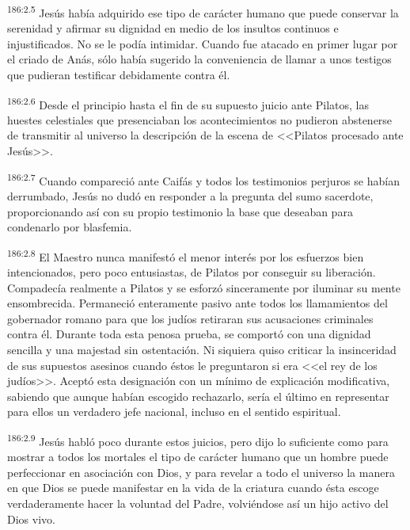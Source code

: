 \par 
\textsuperscript{186:2.5} Jesús había adquirido ese tipo de carácter humano que puede conservar la serenidad y afirmar su dignidad en medio de los insultos continuos e injustificados. No se le podía intimidar. Cuando fue atacado en primer lugar por el criado de Anás, sólo había sugerido la conveniencia de llamar a unos testigos que pudieran testificar debidamente contra él.

\par 
\textsuperscript{186:2.6} Desde el principio hasta el fin de su supuesto juicio ante Pilatos, las huestes celestiales que presenciaban los acontecimientos no pudieron abstenerse de transmitir al universo la descripción de la escena de <<Pilatos procesado ante Jesús>>.

\par 
\textsuperscript{186:2.7} Cuando compareció ante Caifás y todos los testimonios perjuros se habían derrumbado, Jesús no dudó en responder a la pregunta del sumo sacerdote, proporcionando así con su propio testimonio la base que deseaban para condenarlo por blasfemia.

\par 
\textsuperscript{186:2.8} El Maestro nunca manifestó el menor interés por los esfuerzos bien intencionados, pero poco entusiastas, de Pilatos por conseguir su liberación. Compadecía realmente a Pilatos y se esforzó sinceramente por iluminar su mente ensombrecida. Permaneció enteramente pasivo ante todos los llamamientos del gobernador romano para que los judíos retiraran sus acusaciones criminales contra él. Durante toda esta penosa prueba, se comportó con una dignidad sencilla y una majestad sin ostentación. Ni siquiera quiso criticar la insinceridad de sus supuestos asesinos cuando éstos le preguntaron si era <<el rey de los judíos>>. Aceptó esta designación con un mínimo de explicación modificativa, sabiendo que aunque habían escogido rechazarlo, sería el último en representar para ellos un verdadero jefe nacional, incluso en el sentido espiritual.

\par 
\textsuperscript{186:2.9} Jesús habló poco durante estos juicios, pero dijo lo suficiente como para mostrar a todos los mortales el tipo de carácter humano que un hombre puede perfeccionar en asociación con Dios, y para revelar a todo el universo la manera en que Dios se puede manifestar en la vida de la criatura cuando ésta escoge verdaderamente hacer la voluntad del Padre, volviéndose así un hijo activo del Dios vivo.

